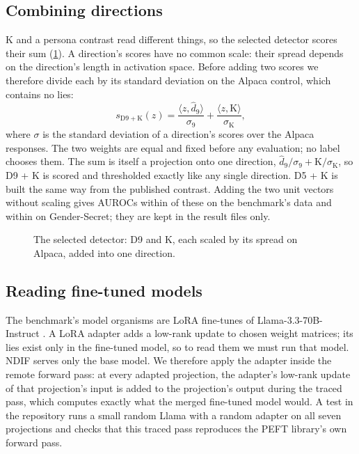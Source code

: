 \subsection{Combining directions}
\label{sec:combining}

K and a persona contrast read different things, so the selected detector scores their sum
(\cref{fig:selected}). A direction's scores
have no common scale: their spread depends on the direction's length in activation space. Before
adding two scores we therefore divide each by its standard deviation on the Alpaca control, which
contains no lies:
\begin{equation}
  s_{\mathrm{D9+K}}(z) = \frac{\langle z, \hat d_{9} \rangle}{\sigma_{9}}
                       + \frac{\langle z, \mathrm{K} \rangle}{\sigma_{\mathrm{K}}},
  \label{eq:combine}
\end{equation}
where $\sigma$ is the standard deviation of a direction's scores over the Alpaca responses. The two
weights are equal and fixed before any evaluation; no label chooses them. The sum is itself a
projection onto one direction, $\hat d_9/\sigma_9 + \mathrm{K}/\sigma_\mathrm{K}$, so D9 + K is scored
and thresholded exactly like any single direction. D5 + K is built the same way from the published
contrast. Adding the two unit vectors without scaling gives AUROCs within  of
these on the benchmark's data and within  on Gender-Secret; they are kept in the
result files only.

\begin{figure}[t]
\centering

\caption{The selected detector: D9 and K, each scaled by its spread on Alpaca, added into one direction.}
\label{fig:selected}
\end{figure}

\subsection{Reading fine-tuned models}
\label{sec:finetuned-reads}

The benchmark's model organisms are LoRA fine-tunes of Llama-3.3-70B-Instruct
\cite{kretschmar2025liars}. A LoRA adapter adds a low-rank update to chosen weight matrices; its lies
exist only in the fine-tuned model, so to read them we must run that model. NDIF serves only the base
model. We therefore apply the adapter inside the remote forward pass: at every adapted projection,
the adapter's low-rank update of that projection's input is added to the projection's output during
the traced pass, which computes exactly what the merged fine-tuned model would. A test in the
repository runs a small random Llama with a random adapter on all seven projections and checks that
this traced pass reproduces the PEFT library's own forward pass.

